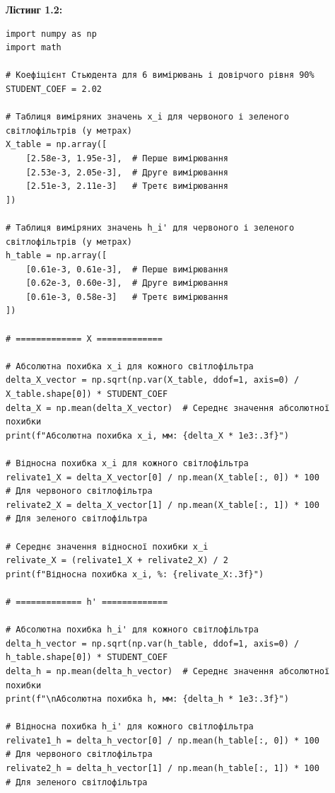 \documentclass[12pt,a4paper]{article}
\begin{document}
    \vspace{3em}

    \hypertarget{listing2}{}

    \textbf{\large Лістинг 1.2:}

    \vspace{1em}

    \small{ 

\begin{verbatim}
import numpy as np
import math

# Коефіцієнт Стьюдента для 6 вимірювань і довірчого рівня 90%
STUDENT_COEF = 2.02

# Таблиця виміряних значень x_i для червоного і зеленого
світлофільтрів (у метрах)
X_table = np.array([
    [2.58e-3, 1.95e-3],  # Перше вимірювання
    [2.53e-3, 2.05e-3],  # Друге вимірювання
    [2.51e-3, 2.11e-3]   # Третє вимірювання
])

# Таблиця виміряних значень h_i' для червоного і зеленого
світлофільтрів (у метрах)
h_table = np.array([
    [0.61e-3, 0.61e-3],  # Перше вимірювання
    [0.62e-3, 0.60e-3],  # Друге вимірювання
    [0.61e-3, 0.58e-3]   # Третє вимірювання
])

# ============= X =============

# Абсолютна похибка x_i для кожного світлофільтра
delta_X_vector = np.sqrt(np.var(X_table, ddof=1, axis=0) /
X_table.shape[0]) * STUDENT_COEF
delta_X = np.mean(delta_X_vector)  # Середнє значення абсолютної
похибки
print(f"Абсолютна похибка x_i, мм: {delta_X * 1e3:.3f}")

# Відносна похибка x_i для кожного світлофільтра
relivate1_X = delta_X_vector[0] / np.mean(X_table[:, 0]) * 100 
# Для червоного світлофільтра
relivate2_X = delta_X_vector[1] / np.mean(X_table[:, 1]) * 100 
# Для зеленого світлофільтра

# Середнє значення відносної похибки x_i
relivate_X = (relivate1_X + relivate2_X) / 2
print(f"Відносна похибка x_i, %: {relivate_X:.3f}")

# ============= h' =============

# Абсолютна похибка h_i' для кожного світлофільтра
delta_h_vector = np.sqrt(np.var(h_table, ddof=1, axis=0) /
h_table.shape[0]) * STUDENT_COEF
delta_h = np.mean(delta_h_vector)  # Середнє значення абсолютної похибки
print(f"\nАбсолютна похибка h, мм: {delta_h * 1e3:.3f}")

# Відносна похибка h_i' для кожного світлофільтра
relivate1_h = delta_h_vector[0] / np.mean(h_table[:, 0]) * 100 
# Для червоного світлофільтра
relivate2_h = delta_h_vector[1] / np.mean(h_table[:, 1]) * 100 
# Для зеленого світлофільтра


\end{verbatim}}
\end{document}

